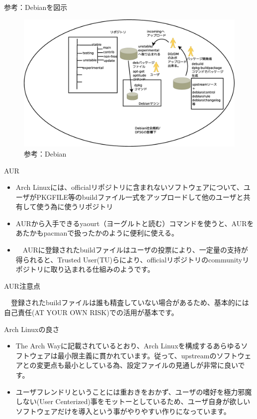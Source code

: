 \begin{frame}{参考：Debianを図示}
\begin{figure}[H]
\begin{center}
 \includegraphics[width=0.9\hsize]{image201411/debian-schema.eps}
\end{center}
\caption{参考：Debian}
\end{figure}
\end{frame}

\begin{frame}{AUR}
\begin{itemize}
\item Arch Linuxには、officialリポジトリに含まれないソフトウェアについて、ユーザがPKGFILE等のbuildファイル一式をアップロードして他のユーザと共有して使う為に使うリポジトリ
\item AURから入手できるyaourt（ヨーグルトと読む）コマンドを使うと、AURをあたかもpacmanで扱ったかのように便利に使える。
\item 　AURに登録されたbuildファイルはユーザの投票により、一定量の支持が得られると、Trusted User(TU)らにより、officialリポジトリのcommunityリポジトリに取り込まれる仕組みのようです。
\end{itemize}
\end{frame}

\begin{frame}{AUR注意点}

  　登録されたbuildファイルは誰も精査していない場合があるため、基本的には自己責任(AT YOUR OWN RISK)での活用が基本です。

\end{frame}  

\begin{frame}{Arch Linuxの良さ}
\begin{itemize}
\item The Arch Wayに記載されているとおり、Arch Linuxを構成するあらゆるソフトウェアは最小限主義に貫かれています。従って、upstreamのソフトウェアとの変更点も最小としている為、設定ファイルの見通しが非常に良いです。
\item ユーザフレンドリということには重おきをおかず、ユーザの嗜好を極力邪魔しない(User Centerized)事をモットーとしているため、ユーザ自身が欲しいソフトウェアだけを導入という事がやりやすい作りになっています。
\end{itemize}

\end{frame}

